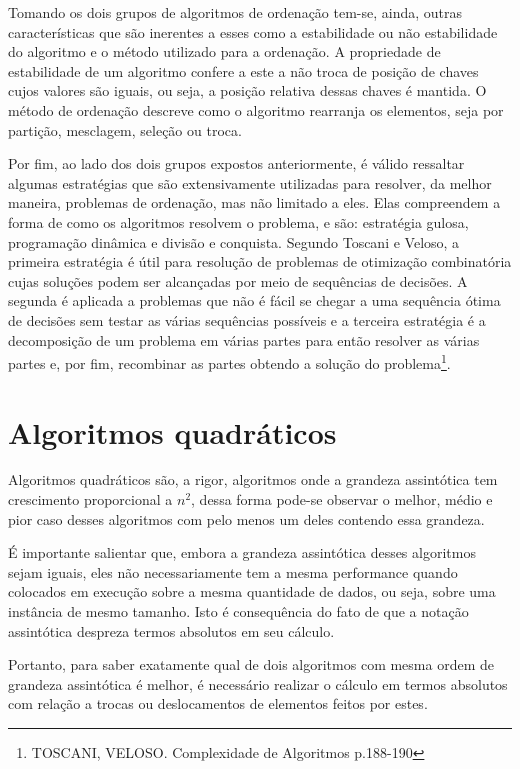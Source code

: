 \documentclass[a4paper, 12pt]{report}
\begin{document}
Tomando os dois grupos de algoritmos de ordenação tem-se, ainda, outras
características que são inerentes a esses como a estabilidade ou não
estabilidade do algoritmo e o método utilizado para a ordenação. A propriedade
de estabilidade de um algoritmo confere a este a não troca de posição de chaves
cujos valores são iguais, ou seja, a posição relativa dessas chaves é mantida.
O método de ordenação descreve como o algoritmo rearranja os elementos, seja
por partição, mesclagem, seleção ou troca.

Por fim, ao lado dos dois grupos expostos anteriormente, é válido ressaltar
algumas estratégias que são extensivamente utilizadas para resolver, da melhor
maneira, problemas de ordenação, mas não limitado a eles. Elas compreendem a
forma de como os algoritmos resolvem o problema, e são: estratégia gulosa,
programação dinâmica e divisão e conquista. Segundo Toscani e Veloso, a
primeira estratégia é útil para resolução de problemas de otimização
combinatória cujas soluções podem ser alcançadas por meio de sequências de
decisões. A segunda é aplicada a problemas que não é fácil se chegar a uma
sequência ótima de decisões sem testar as várias sequências possíveis e a
terceira estratégia é a decomposição de um problema em várias partes para então
resolver as várias partes e, por fim, recombinar as partes obtendo a solução
do problema\footnote{TOSCANI, VELOSO. Complexidade de Algoritmos p.188-190}.

\chapter{Algoritmos quadráticos}
\label{sec-2-1}
Algoritmos quadráticos são, a rigor, algoritmos onde a grandeza assintótica tem
crescimento proporcional a $n^2$, dessa forma pode-se observar o melhor, médio
e pior caso desses algoritmos com pelo menos um deles contendo essa grandeza.

É importante salientar que, embora a grandeza assintótica desses algoritmos
sejam iguais, eles não necessariamente tem a mesma performance quando
colocados em execução sobre a mesma quantidade de dados, ou seja, sobre uma
instância de mesmo tamanho. Isto é consequência do fato de que a notação
assintótica despreza termos absolutos em seu cálculo.

Portanto, para saber exatamente qual de dois algoritmos com mesma ordem de
grandeza assintótica é melhor, é necessário realizar o cálculo em termos
absolutos com relação a trocas ou deslocamentos de elementos feitos por estes.
\end{document}
